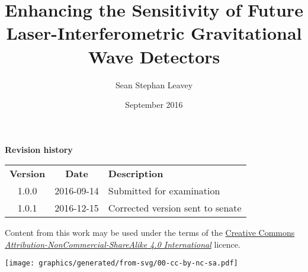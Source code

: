 \documentclass[twoside,hidelinks]{glasgowthesis}
\begin{document}

\title{Enhancing the Sensitivity of Future Laser-Interferometric Gravitational Wave Detectors}
\author{Sean Stephan Leavey}
\date{September 2016}

\maketitle

\cleardoublepage




\newpage
{}
{}


\newpage
{}
{}
\vspace*{3.5in}
\begin{center}
  \textbf{Revision history} \\
  \begin{tabular}{ccl}
    \textbf{Version} & \textbf{Date} & \textbf{Description} \\
    1.0.0            & 2016-09-14    & Submitted for examination \\
    1.0.1            & 2016-12-15    & Corrected version sent to senate \\
  \end{tabular}
\end{center}

\newpage
{}
\vspace*{8in}
\noindent Content from this work may be used under the terms of the \href{https://creativecommons.org/licenses/by-nc-sa/4.0/}{Creative Commons \emph{Attribution-NonCommercial-ShareAlike 4.0 International}} licence.
\begin{center}
  \texttt{[image: graphics/generated/from-svg/00-cc-by-nc-sa.pdf]}
\end{center}

\cleardoublepage
{}
\renewcommand{\contentsname}{Table of contents}
\tableofcontents

\cleardoublepage
{}
\renewcommand{\listtablename}{List of tables}
\listoftables
\end{document}
